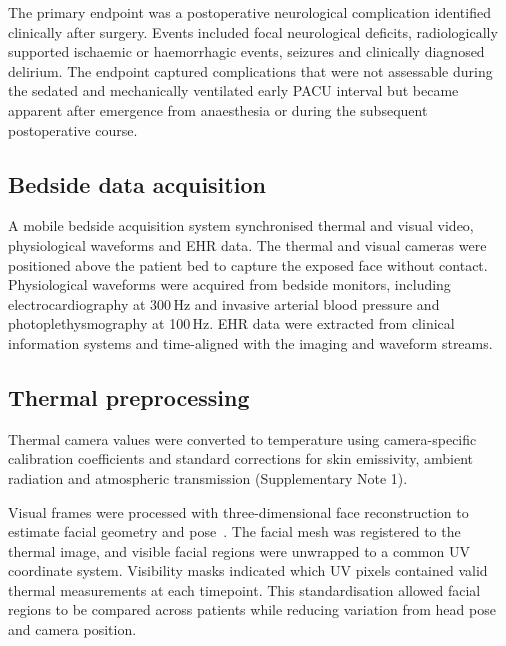 \documentclass[pdflatex,sn-basic,Numbered]{sn-jnl}
\theoremstyle{thmstyleone}%
\theoremstyle{thmstyletwo}%
\theoremstyle{thmstylethree}%
\begin{document}
The primary endpoint was a postoperative neurological complication identified clinically after surgery. Events included focal neurological deficits, radiologically supported ischaemic or haemorrhagic events, seizures and clinically diagnosed delirium. The endpoint captured complications that were not assessable during the sedated and mechanically ventilated early PACU interval but became apparent after emergence from anaesthesia or during the subsequent postoperative course.

\subsection{Bedside data acquisition}

A mobile bedside acquisition system synchronised thermal and visual video, physiological waveforms and EHR data. The thermal and visual cameras were positioned above the patient bed to capture the exposed face without contact. Physiological waveforms were acquired from bedside monitors, including electrocardiography at 300\,Hz and invasive arterial blood pressure and photoplethysmography at 100\,Hz. EHR data were extracted from clinical information systems and time-aligned with the imaging and waveform streams.

\subsection{Thermal preprocessing}

Thermal camera values were converted to temperature using camera-specific calibration coefficients and standard corrections for skin emissivity, ambient radiation and atmospheric transmission (Supplementary Note 1).

Visual frames were processed with three-dimensional face reconstruction to estimate facial geometry and pose~\citep{feng2018joint, Deng_2020_CVPR, guo2020towards}. The facial mesh was registered to the thermal image, and visible facial regions were unwrapped to a common UV coordinate system. Visibility masks indicated which UV pixels contained valid thermal measurements at each timepoint. This standardisation allowed facial regions to be compared across patients while reducing variation from head pose and camera position.
\end{document}
